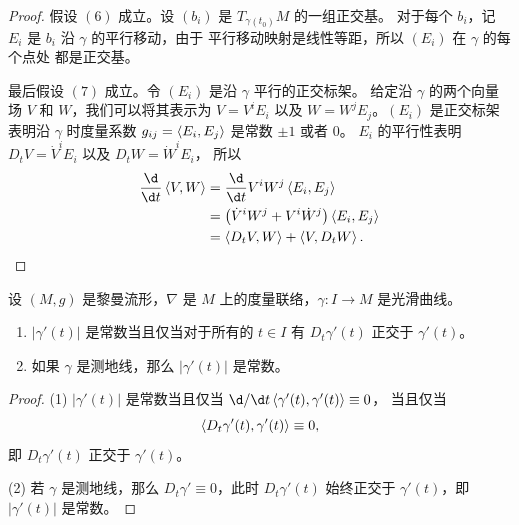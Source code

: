 \begin{proof}
  假设 $(6)$ 成立。设 $(b_i)$ 是 $T_{\gamma(t_0)}M$ 的一组正交基。
  对于每个 $b_i$，记 $E_i$ 是 $b_i$ 沿 $\gamma$ 的平行移动，由于
  平行移动映射是线性等距，所以 $(E_i)$ 在 $\gamma$ 的每个点处
  都是正交基。

  最后假设 $(7)$ 成立。令 $(E_i)$ 是沿 $\gamma$ 平行的正交标架。
  给定沿 $\gamma$ 的两个向量场 $V$ 和 $W$，我们可以将其表示为
  $V=V^iE_i$ 以及 $W=W^jE_j$。$(E_i)$ 是正交标架表明沿 $\gamma$
  时度量系数 $g_{ij}=\left\langle E_i,E_j\right\rangle$ 是常数 $\pm 1$ 或者 $0$。
  $E_i$ 的平行性表明 $D_tV=\dot V^iE_i$ 以及 $D_tW=\dot W^iE_i$，
  所以 
  \begin{align*}
    \frac{\d}{\d t}\inn{V,W}&=\frac{\d}{\d t}V^iW^j\inn{E_i,E_j}\\
    &=\bigl(\dot V^iW^j+V^i\dot W^j\bigr)\inn{E_i,E_j}\\
    &=\inn{D_tV,W}+\inn{V,D_tW}.\qedhere
  \end{align*}
\end{proof}
 
\begin{corollary}
  设 $(M,g)$ 是黎曼流形，$\nabla$ 是 $M$ 上的度量联络，$\gamma:I\to M$
  是光滑曲线。
  \begin{enumerate}
    \item $|\gamma'(t)|$ 是常数当且仅当对于所有的 $t\in I$ 有 $D_t\gamma'(t)$ 正交于 $\gamma'(t)$。
    \item 如果 $\gamma$ 是测地线，那么 $|\gamma'(t)|$ 是常数。
  \end{enumerate}
\end{corollary}
\begin{proof}
  (1) $|\gamma'(t)|$ 是常数当且仅当 $\d/\d t\inn{\gamma'(t),\gamma'(t)}\equiv 0$，
  当且仅当
  \[
    \left\langle D_t\gamma'(t),\gamma'(t)\right\rangle \equiv 0,
  \]
  即 $D_t\gamma'(t)$ 正交于 $\gamma'(t)$。

  (2) 若 $\gamma$ 是测地线，那么 $D_t\gamma'\equiv 0$，此时 $D_t\gamma'(t)$
  始终正交于 $\gamma'(t)$，即 $|\gamma'(t)|$ 是常数。
\end{proof}

